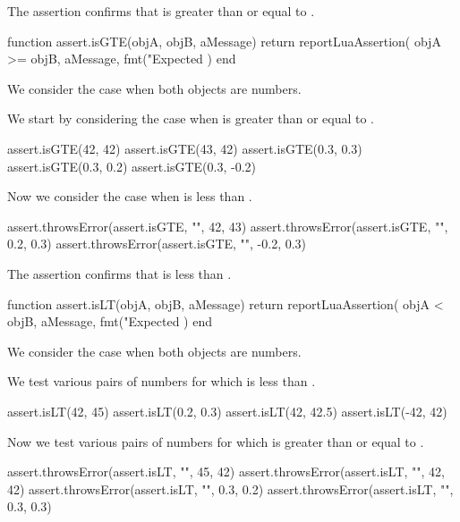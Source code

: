 \stopTestSuite


The  assertion confirms that  is greater 
than or equal to . 

\startLuaCode
function assert.isGTE(objA, objB, aMessage)
  return reportLuaAssertion(
    objA >= objB,
    aMessage,
    fmt("Expected %
  )
end
\stopLuaCode


We consider the case when both objects are numbers.

We start by considering the case when  is greater than or equal 
to . 

\startLuaTest
  assert.isGTE(42, 42)
  assert.isGTE(43, 42)
  assert.isGTE(0.3, 0.3)
  assert.isGTE(0.3, 0.2)
  assert.isGTE(0.3, -0.2)
\stopLuaTest

Now we consider the case when  is less than . 

\startLuaTest
  assert.throwsError(assert.isGTE, "", 42, 43)
  assert.throwsError(assert.isGTE, "", 0.2, 0.3)
  assert.throwsError(assert.isGTE, "", -0.2, 0.3)
\stopLuaTest
\stopTestCase

\stopTestSuite


The  assertion confirms that  is less than 
. 

\startLuaCode
function assert.isLT(objA, objB, aMessage)
  return reportLuaAssertion(
    objA < objB,
    aMessage,
    fmt("Expected %
  )
end
\stopLuaCode


We consider the case when both objects are numbers.

We test various pairs of numbers for which  is less than 
. 

\startLuaTest
  assert.isLT(42, 45)
  assert.isLT(0.2, 0.3)
  assert.isLT(42, 42.5)
  assert.isLT(-42, 42)
\stopLuaTest

Now we test various pairs of numbers for which  is greater than 
or equal to . 

\startLuaTest
  assert.throwsError(assert.isLT, "", 45, 42)
  assert.throwsError(assert.isLT, "", 42, 42)
  assert.throwsError(assert.isLT, "", 0.3, 0.2)
  assert.throwsError(assert.isLT, "", 0.3, 0.3)
\stopLuaTest
\stopTestCase

